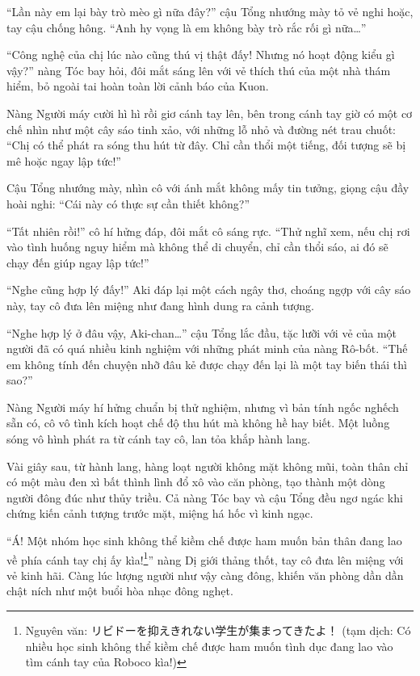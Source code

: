 \documentclass[../main.tex]{subfiles}
\begin{document}

``Lần này em lại bày trò mèo gì nữa đây?'' cậu Tổng nhướng mày tỏ vẻ nghi hoặc, tay cậu chống hông. ``Anh hy vọng là em không bày trò rắc rối gì nữa\dots''

``Công nghệ của chị lúc nào cũng thú vị thật đấy! Nhưng nó hoạt động kiểu gì vậy?'' nàng Tóc bay hỏi, đôi mắt sáng lên với vẻ thích thú của một nhà thám hiểm, bỏ ngoài tai hoàn toàn lời cảnh báo của Kuon.

Nàng Người máy cười hì hì rồi giơ cánh tay lên, bên trong cánh tay giờ có một cơ chế nhìn như một cây sáo tinh xảo, với những lỗ nhỏ và đường nét trau chuốt: ``Chị có thể phát ra sóng thu hút từ đây. Chỉ cần thổi một tiếng, đối tượng sẽ bị mê hoặc ngay lập tức!''

Cậu Tổng nhướng mày, nhìn cô với ánh mắt không mấy tin tưởng, giọng cậu đầy hoài nghi: ``Cái này có thực sự cần thiết không?''

``Tất nhiên rồi!'' cô hí hửng đáp, đôi mắt cô sáng rực. ``Thử nghĩ xem, nếu chị rơi vào tình huống nguy hiểm mà không thể di chuyển, chỉ cần thổi sáo, ai đó sẽ chạy đến giúp ngay lập tức!''

``Nghe cũng hợp lý đấy!'' Aki đáp lại một cách ngây thơ, choáng ngợp với cây sáo này, tay cô đưa lên miệng như đang hình dung ra cảnh tượng.

``Nghe hợp lý ở đâu vậy, Aki-chan\dots'' cậu Tổng lắc đầu, tặc lưỡi với vẻ của một người đã có quá nhiều kinh nghiệm với những phát minh của nàng Rô-bốt. ``Thế em không tính đến chuyện nhỡ đâu kẻ được chạy đến lại là một tay biến thái thì sao?''

Nàng Người máy hí hửng chuẩn bị thử nghiệm, nhưng vì bản tính ngốc nghếch sẵn có, cô vô tình kích hoạt chế độ thu hút mà không hề hay biết. Một luồng sóng vô hình phát ra từ cánh tay cô, lan tỏa khắp hành lang.

Vài giây sau, từ hành lang, hàng loạt người không mặt không mũi, toàn thân chỉ có một màu đen xì bất thình lình đổ xô vào căn phòng, tạo thành một dòng người đông đúc như thủy triều. Cả nàng Tóc bay và cậu Tổng đều ngơ ngác khi chứng kiến cảnh tượng trước mặt, miệng há hốc vì kinh ngạc.


``Á! Một nhóm học sinh không thể kiềm chế được ham muốn bản thân đang lao về phía cánh tay chị ấy kìa!\footnote{Nguyên văn: ​リビドーを抑えきれない学生が集まってきたよ！ (tạm dịch: Có nhiều học sinh không thể kiềm chế được ham muốn tình dục đang lao vào tìm cánh tay của Roboco kìa!)}'' nàng Dị giới thảng thốt, tay cô đưa lên miệng với vẻ kinh hãi. Càng lúc lượng người như vậy càng đông, khiến văn phòng dần dần chật ních như một buổi hòa nhạc đông nghẹt.
\end{document}

